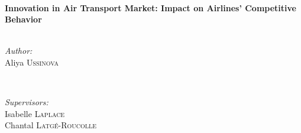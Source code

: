 \documentclass[titlepage, 11pt]{article}
\begin{document}
\begin{titlepage}

\HRule \\[0.4cm]
{ \huge \bfseries Innovation in Air Transport Market: Impact on Airlines' Competitive Behavior}\\[0.4cm] %
\HRule \\[1.5cm]
 

\begin{minipage}{0.4\textwidth}
\begin{flushleft} \large
\emph{Author:}\\
Aliya \textsc{Ussinova} %
\end{flushleft}
\end{minipage}
~
\begin{minipage}{0.4\textwidth}
\begin{flushright} \large
\emph{Supervisors:} \\
Isabelle \textsc{Laplace} \\ %
Chantal \textsc{Latgé-Roucolle} %

\end{flushright}
\end{minipage}\\[2cm]






\vfill %

\end{titlepage}
\newcommand\tab[1][1cm]{\hspace*{#1}} 
\tableofcontents 
\listoffigures
\listoftables
\end{document}
